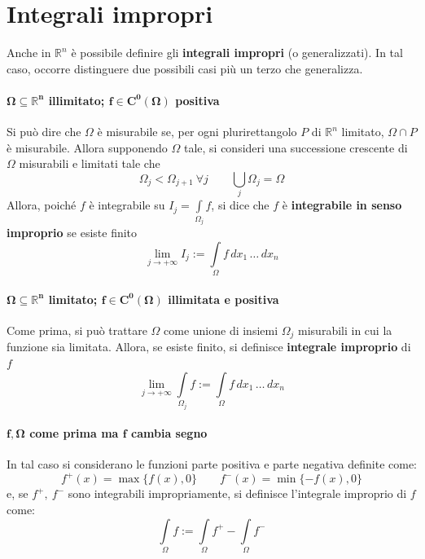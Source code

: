 \section{Integrali impropri}
Anche in $\mathbb{R}^n$ è possibile definire gli \textbf{integrali impropri} (o generalizzati). In tal caso, occorre distinguere due possibili casi più un terzo che generalizza.
\paragraph{$\mathbf{\Omega \subseteq \mathbb{R}^n}$ illimitato; $\mathbf{f \in C^0(\Omega)}$ positiva}
Si può dire che $\Omega$ è misurabile se, per ogni plurirettangolo $P$ di $\mathbb{R}^n$ limitato, $\Omega \cap P$ è misurabile. Allora supponendo $\Omega$ tale, si consideri una successione crescente di $\Omega$ misurabili e limitati tale che 
\begin{equation}
 \Omega_j<\Omega_{j+1}\ \forall j \qquad \bigcup\limits_{j}{\Omega_j}=\Omega
\end{equation}
Allora, poiché $f$ è integrabile su $I_j=\int\limits_{\Omega_j}{f}$, si dice che $f$ è \textbf{integrabile in senso improprio} se esiste finito
\begin{equation}
    \lim_{j \to +\infty} I_j := \int\limits_\Omega{f}\,dx_1\, \dots \,dx_n
\end{equation}
\paragraph{$\mathbf{\Omega \subseteq \mathbb{R}^n}$ limitato; $\mathbf{f \in C^0(\Omega)}$ illimitata e positiva} Come prima, si può trattare $\Omega$ come unione di insiemi $\Omega_j$ misurabili in cui la funzione sia limitata. Allora, se esiste finito, si definisce \textbf{integrale improprio} di $f$
\begin{equation}
    \lim_{j \to +\infty} \int\limits_{\Omega_j}f :=    \int\limits_{\Omega} f\,dx_1\, \dots \,dx_n
\end{equation}
\paragraph{$\mathbf{f, \Omega}$ come prima ma $\mathbf{f}$ cambia segno} In tal caso si considerano le funzioni parte positiva e parte negativa definite come:
\begin{equation}
    f^+(x)=\max\{f(x), 0\} \qquad f^-(x)=\min\{-f(x), 0\}
\end{equation}
e, se $f^+,\ f^-$ sono integrabili impropriamente, si definisce l'integrale improprio di $f$ come:
\begin{equation*}
    \int\limits_{\Omega}f := \int\limits_{\Omega} f^+ - \int\limits_{\Omega} f^-
\end{equation*}
